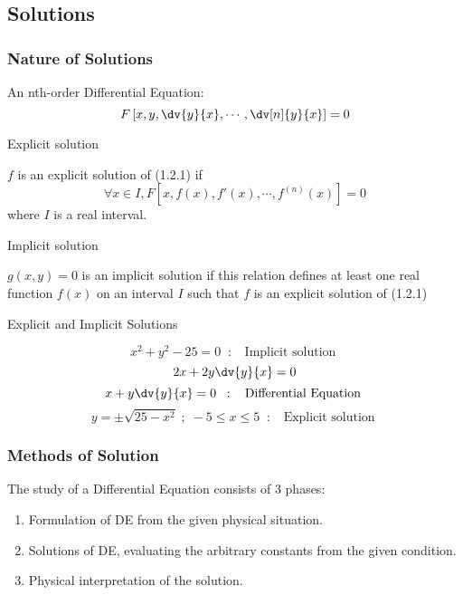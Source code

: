 \subsection{Solutions}


\subsubsection{Nature of Solutions}
An nth-order Differential Equation:
\begin{equation}
    F \left[ x, y, \dv{y}{x}, \cdots, \dv[n]{y}{x} \right] = 0
\end{equation}

\begin{definition}{Explicit solution}
    
    $f$ is an explicit solution of (1.2.1) if \[
        \forall x \in I, F \left[ x, f(x), f'(x), \cdots, f^{(n)}(x) \right] = 0
    \] where $I$ is a real interval.
\end{definition}

\begin{definition}{Implicit solution}
    
    $g(x,y)=0$ is an implicit solution if this relation defines at least one real function $f(x)$ on an interval $I$ such that $f$ is an explicit solution of (1.2.1)
\end{definition}

\begin{example}{Explicit and Implicit Solutions}
    
    \[ x^2 + y^2 - 25 = 0 \;\;:\;\; \text{ Implicit solution } \]
    \[ 2x + 2y\dv{y}{x} = 0 \]
    \[ x + y\dv{y}{x} = 0 \;\;:\;\; \text{ Differential Equation } \]
    \[ y = \pm \sqrt{25 - x^2} \;;\; -5 \le x \le 5 \;\;:\;\; \text{ Explicit solution } \]
\end{example}


\subsubsection{Methods of Solution}

The study of a Differential Equation consists of $3$ phases:
\begin{enumerate}
    \item Formulation of DE from the given physical situation.
    \item Solutions of DE, evaluating the arbitrary constants from the given condition.
    \item Physical interpretation of the solution.
\end{enumerate}

